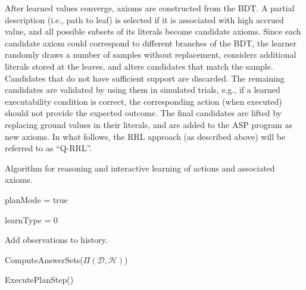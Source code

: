 \documentclass{article}
\begin{document}

After learned values converge, axioms are constructed from the BDT. A
partial description (i.e., path to leaf) is selected if it is
associated with high accrued value, and all possible subsets of its
literals become candidate axioms. Since each candidate axiom could
correspond to different branches of the BDT, the learner randomly
draws a number of samples without replacement, considers additional
literals stored at the leaves, and alters candidates that match the
sample. Candidates that do not have sufficient support are discarded.
The remaining candidates are validated by using them in simulated
trials, e.g., if a learned executability condition is correct, the
corresponding action (when executed) should not provide the expected
outcome. The final candidates are lifted by replacing ground values in
their literals, and are added to the ASP program as new axioms. In
what follows, the RRL approach (as described above) will be referred
to as ``Q-RRL''.

\begin{algorithm}[tbh]
  \caption{Algorithm for reasoning and interactive learning of actions
    and associated axioms.}
  \label{alg:learn}
  
  \Indm


  
  \Indp \BlankLine \SetNoFillComment


  planMode = true

  learnType = 0

  \BlankLine

   {
  
    Add observations to history.

    ComputeAnswerSets($\Pi(\mathcal{D}, \mathcal{H})$)

     {
     
       {
         {
          ExecutePlanStep()
	}		
      }
    }
  }       
\end{algorithm}
\end{document}
